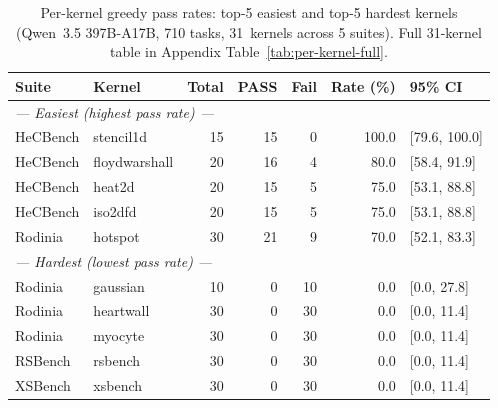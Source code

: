\documentclass[conference]{IEEEtran}
\begin{document}
\begin{table}[t]
\centering
\caption{Per-kernel greedy pass rates: top-5 easiest and top-5 hardest kernels (Qwen~3.5 397B-A17B, 710 tasks, 31~kernels across 5 suites). Full 31-kernel table in Appendix Table~\ref{tab:per-kernel-full}.}
\label{tab:per-kernel}
\small
\begin{tabular}{@{}llrrrrl@{}}
\toprule
Suite & Kernel & Total & PASS & Fail & Rate (\%) & 95\% CI \\
\midrule
\multicolumn{7}{l}{\textit{--- Easiest (highest pass rate) ---}} \\
HeCBench & stencil1d & 15 & 15 & 0 & 100.0 & [79.6, 100.0] \\ %
HeCBench & floydwarshall & 20 & 16 & 4 & 80.0 & [58.4, 91.9] \\ %
HeCBench & heat2d & 20 & 15 & 5 & 75.0 & [53.1, 88.8] \\ %
HeCBench & iso2dfd & 20 & 15 & 5 & 75.0 & [53.1, 88.8] \\ %
Rodinia & hotspot & 30 & 21 & 9 & 70.0 & [52.1, 83.3] \\ %
\midrule
\multicolumn{7}{l}{\textit{--- Hardest (lowest pass rate) ---}} \\
Rodinia & gaussian & 10 & 0 & 10 & 0.0 & [0.0, 27.8] \\ %
Rodinia & heartwall & 30 & 0 & 30 & 0.0 & [0.0, 11.4] \\ %
Rodinia & myocyte & 30 & 0 & 30 & 0.0 & [0.0, 11.4] \\ %
RSBench & rsbench & 30 & 0 & 30 & 0.0 & [0.0, 11.4] \\ %
XSBench & xsbench & 30 & 0 & 30 & 0.0 & [0.0, 11.4] \\ %
\bottomrule
\end{tabular}
\end{table}
\end{document}
